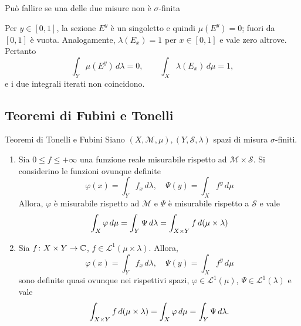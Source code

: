 \documentclass[a4paper]{article}
\begin{document}
\begin{radioactive}
\begin{snippetexample}{Può fallire se una delle due misure non è \(\sigma\)-finita}
\begin{center}
    \end{center}
    Per \(y\in[0,1]\), la sezione \(E^y\) è un singoletto e quindi
    \(\mu(E^y)=0\); fuori da \([0,1]\) è vuota. Analogamente,
    \(\lambda(E_x)=1\) per \(x\in[0,1]\) e vale zero altrove. Pertanto
    \[
        \int_Y \mu(E^y)\,d\lambda=0,
        \qquad
        \int_X \lambda(E_x)\,d\mu=1,
    \]
    e i due integrali iterati non coincidono.
\end{snippetexample}
\end{radioactive}

\subsection{Teoremi di Fubini e Tonelli}

\begin{radioactive}
\begin{snippettheorem}{Teoremi di Tonelli e Fubini}
    Siano \((X, \mathcal M, \mu), (Y, \mathcal S, \lambda)\)
    spazi di misura \(\sigma\)-finiti.
    \begin{enumerate}
        \item Sia \(0 \leq f \leq +\infty\) una funzione reale
            misurabile rispetto ad \(\mathcal M \times \mathcal S\).
            Si considerino le funzioni ovunque definite
            \[
                \varphi(x) = \int_Y f_x\,d\lambda, \quad
                \Psi(y) = \int_X f^y\,d\mu
            \]
            Allora, \(\varphi\) è misurabile rispetto ad \(\mathcal M\)
            e \(\Psi\) è misurabile rispetto a \(\mathcal S\) e vale
            \[
                \int_X \varphi\,d\mu = \int_Y\Psi\,d\lambda
                = \int_{X \times Y} f\,d(\mu \times \lambda)
            \]
        \item Sia \(f \colon X \times Y \to \mathbb{C}\),
            \(f \in \mathcal L^1(\mu \times \lambda)\). Allora, \[
                \varphi(x) = \int_Y f_x\,d\lambda, \quad
                \Psi(y) = \int_X f^y\,d\mu
            \]
            sono definite quasi ovunque nei rispettivi spazi,
            \(\varphi\in\mathcal L^1(\mu)\), \(\Psi\in\mathcal L^1(\lambda)\) e vale
            \[
                \int_{X\times Y}f\,d(\mu\times\lambda)
                =\int_X\varphi\,d\mu
                =\int_Y\Psi\,d\lambda.
            \]
    \end{enumerate}
\end{snippettheorem}
\end{radioactive}
\end{document}
